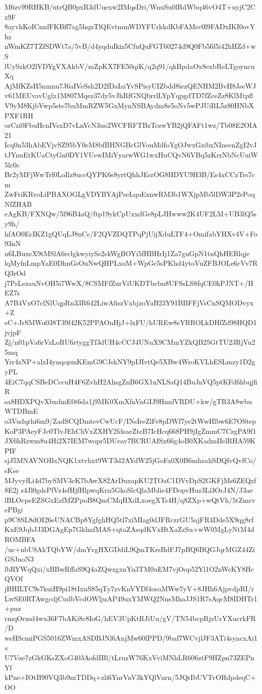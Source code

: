 M6zv99RHKB/ntrQB0pxR3dUuexw2IMqsDri/WnuSu0lRdWbq46vO4T+uyjC2Cz9F
8ayvhKoICnnfFKBff7ag5hqxTlQEvtmmWDYFUrkkdKbFAMcc0l9FADxIKI0ovYhz
nWmKZ7TZfSDWt7a/5vB/d4yqduIkiz5CfuQuFGT60274d9Q0Fb56l5i42hHZd+wS
lUySzkO2lVDYgVXAkbV/mZpKX7FE50qiK/q2q91/qkBpdaOx8exbReLTgoyncuXq
AjMfKZsH5nmnu7J6aIVeSsh2D2fDaIaiYvSPisyUIZbdd8iezQENHM2BvH8JseWJ
v61MEUvavUglx1M807Mqez37dy5vJhRfGNQbrrlLYpYqpgdTD7fZceZz8KlMtpfl
V9yM8KjbVwp5ste7buMmRZW5GxMynNSBAydm8e5oNv5wPJUiRL5z80HNbXPXF1RH
orCzi0FbuHcnIVsxD7vLnVcN3uo2WCFRFTBzTczwYB2jQFAFt1wz/Tb08E2OIA21
Icq0n53hAbEVjvSZ95bY0eM8bfBHNGBcGlVouMdfoYgOJwxGzibxNIneenZgI2vJ
tJYnuEtKUaCtyGn0DY1VUewIMiYyarwWG1wxHuCQvN6VBq5zKrrNbNcUuiW5lc0c
Br2yMFjWwTrl0LoIlz8uccQYPK6s8yrtQhhJEsrOG8HDYU9H3B/Es4xCCzTrs7cm
ZwFriKRvoLiPBAXOGLgVDYBYAjPseLquExnwRM3b1WXjpMb5lDW3P2ePoqNfZHAB
eAgKB/FXNQw/5l96B4aQ/ftp19ykCpUxxdGe8pLJHwww2K4UF2LM+UB3lQ5sy9h/
hfAO0EcIKZ1gQUqLJ8nCe/F2QVZDQTPqPjUijXduLTF4+OmifabYHXv4V+Fo93nN
n6LBuxeX9tMSlA6rclgkwyiySs2skWgBOYi5fHBHrIj1Za7guGpN1tnQhHERlqje
lqMyfnLmpYaE0DhnGsOuNwQHPLxoM+WpGc5sPKhd4ytoVuZFBJOLe6cVv7RQ3rOd
j7PsLezauNvOH5i7WwX/8CSMFfZurViUKDTbcbn8UFSsLS8fqCE0kPJNT+/HEZ7s
A7B4VxO7clNlUqpRn33R642LiwAfiszVxbjzoYaB23Y91BBFFjVsCnSQMODvyx+Z
eC+JrSMWu038T39f42K52PPAOnHjJ+lxFU/hUREw8eYRROLkDHfZd98HQD1jvjpF
Zj/n01pVa6rVzLoRU6rtyggTf3dUH4cCCJ4UNuX9CMmYZkQB25GtTU23RjVu25mq
Yrr4zNP+alxI4ynqopmKEmG9CJskNY9pIJIvtQe5XBw4WroKVLhESLmzy1D2gyPL
4EiC7qqCSBeDCccuH4F6ZvhH2AhsgZnB6GX1nNLSaQ14BuJnVQ5ptKFd6hbqjfiR
sa8HDXPQvXbxdmE0t6da1j9MK0XmXfnVnGIJ9HnnlVRDU+kw/gTR3A8wbuWTDBmE
o3Vudqrhi6m9/ZadSCQDmtevCwUcF/INsIreZlFe8pDWf7ye2tWwHlbw6E7OStep
KoP3PAeyFJc0TlvJEhChVxZXHY2fdsaeZteB7IcHcq668PH9jIgZmmC7CzgPA9f1
JX6hRzwm8u4Hi2X7IEM7wopr5DUeav7BCRUAISx66g4oB0XKadmIIelRHA59KPIF
sjJ5MNAVNOBxNQK1xtvhxt9WT3d2AYdW25jGoFa0X0B6mhzahSDQfvQvfCo/sKse
MJyvyfLi4d7bySMV3cK7bAwX82ArDuxapKU2TOaC1DVvDpS2GKFjMs6ZEQzf8E2j
s4Jl0gdsPfVz4sfHjfHlpwqKrn5GkoSlcQlaMblie4FDopvHuz3Li3OrJ4N/J3ae
lBLOcpeEZSGxEzfMZPpoB8QmCMqHXdLxoegXTs4H/q8ZXp+wQtVh/5tZmrvePBgi
p9C8SL8dOI26eUNACBp8YgfghHQ5tl7xiMIag0dJFRczrGU5ajFR4Dde5X9qg8rf
KxE9JqbJJ3DGAgEp7GklmfMAS+qtaZAsqdKVxHtXaZzSu+wW0MgLyNtM4dROMBFA
/uc+nbU8AkTQbYW/dmYvgHXGDdiL9QmTKrsBdFJ7pBQ6BQGJqrMGZ44ZiGSJnoN3
lbRYWqQxi/xBBwRffaS9Q4aZQwzgxnYu3TM0uEM7vjOop52Yl1O2nWcKY8HcQVOf
jBHILTC9s7kuiH9pi18tIxnS85qTy7zvKnVYDf4osaMWw7yV+8JHh6AjpvdpRI/r
LwSE0RTAwgcdjCudbVcdOWljuAP49uxYMWQ2NnsMhaJJS1R7sAqcM8IDHTr1+puz
rmqOrmd4wx36F7bAKi8c8IoG/hEV3UpKtRJiUu/gV/TN54bcpRjzUrYXucrkFR/D
weHScmiPGS5016ZWmxASDBJNl6AnjMw60lPPD/9baf7WCvjlJF3ATi4syncxAi1v
U7Vue7zGkGKsZXoG403AofdIBl/tLruzW76KxVviMNhLR606ztF9HZpn73ZEPnYf
kPne+IOtB90VQ3b9zzTDDq+zli6YnrVnV3kYQlVurn/5JQrIbUVTvORdpdeqC+OO
